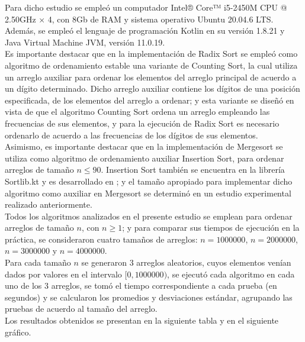 \documentclass[titlepage]{article}
\begin{document}
	Para dicho estudio se emple\'o un computador Intel® Core™ i5-2450M CPU @ 2.50GHz × 4, con 8Gb de RAM y sistema operativo Ubuntu 20.04.6 LTS. Adem\'as, se emple\'o el lenguaje de programaci\'on Kotlin en su versi\'on 1.8.21 y Java Virtual Machine JVM, versi\'on 11.0.19.\\
	
	Es importante destacar que en la implementaci\'on de Radix Sort se emple\'o como algoritmo de ordenamiento estable una variante de Counting Sort, la cual utiliza un arreglo auxiliar para ordenar los elementos del arreglo principal de acuerdo a un d\'igito determinado. Dicho arreglo auxiliar contiene los d\'igitos de una posici\'on especificada, de los elementos del arreglo a ordenar; y esta variante se diseñ\'o en vista de que el algoritmo Counting Sort ordena un arreglo empleando las frecuencias de sus elementos, y para la ejecuci\'on de Radix Sort es necesario ordenarlo de acuerdo a las frecuencias de los d\'igitos de sus elementos.\\
	
	Asimismo, es importante destacar que en la implementaci\'on de Mergesort se utiliza como algoritmo de ordenamiento auxiliar Insertion Sort, para ordenar arreglos de tamaño $n \leq 90$. Insertion Sort tambi\'en se encuentra en la librer\'ia Sortlib.kt y es desarrollado en \cite{6}; y el tamaño apropiado para implementar dicho algoritmo como auxiliar en Mergesort se determin\'o en un estudio experimental realizado anteriormente.\\
	
	Todos los algoritmos analizados en el presente estudio se emplean para ordenar arreglos de tamaño $n$, con $n \geq 1$; y para comparar sus tiempos de ejecuci\'on en la pr\'actica, se consideraron cuatro tamaños de arreglos: $n = 1000000$, $n = 2000000$, $n = 3000000$ y $n = 4000000$.\\
	
	Para cada tamaño $n$ se generaron $3$ arreglos aleatorios, cuyos elementos ven\'ian dados por valores en el intervalo $[0,1000000)$, se ejecut\'o cada algoritmo en cada uno de los $3$ arreglos, se tom\'o el tiempo correspondiente a cada prueba (en segundos) y se calcularon los promedios y desviaciones est\'andar, agrupando las pruebas de acuerdo al tamaño del arreglo.\\
	
	Los resultados obtenidos se presentan en la siguiente tabla y en el siguiente gr\'afico. 
\end{document}
